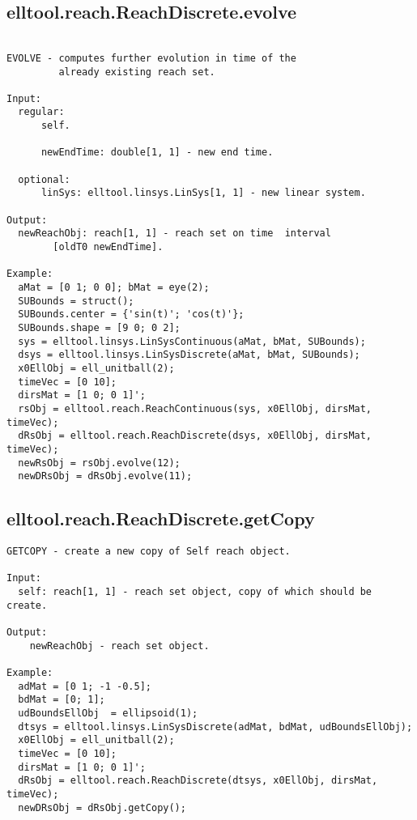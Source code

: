 \subsection{\texorpdfstring{elltool.reach.ReachDiscrete.evolve}{evolve}}\label{method:elltool.reach.ReachDiscrete.evolve}
\begin{verbatim}

EVOLVE - computes further evolution in time of the
         already existing reach set.

Input:
  regular:
      self.

      newEndTime: double[1, 1] - new end time.

  optional:
      linSys: elltool.linsys.LinSys[1, 1] - new linear system.

Output:
  newReachObj: reach[1, 1] - reach set on time  interval
        [oldT0 newEndTime].

Example:
  aMat = [0 1; 0 0]; bMat = eye(2);
  SUBounds = struct();
  SUBounds.center = {'sin(t)'; 'cos(t)'};
  SUBounds.shape = [9 0; 0 2];
  sys = elltool.linsys.LinSysContinuous(aMat, bMat, SUBounds);
  dsys = elltool.linsys.LinSysDiscrete(aMat, bMat, SUBounds);
  x0EllObj = ell_unitball(2);
  timeVec = [0 10];
  dirsMat = [1 0; 0 1]';
  rsObj = elltool.reach.ReachContinuous(sys, x0EllObj, dirsMat, timeVec);
  dRsObj = elltool.reach.ReachDiscrete(dsys, x0EllObj, dirsMat, timeVec);
  newRsObj = rsObj.evolve(12);
  newDRsObj = dRsObj.evolve(11);
\end{verbatim}
\subsection{\texorpdfstring{elltool.reach.ReachDiscrete.getCopy}{getCopy}}\label{method:elltool.reach.ReachDiscrete.getCopy}
\begin{verbatim}
GETCOPY - create a new copy of Self reach object.

Input:
  self: reach[1, 1] - reach set object, copy of which should be create.

Output:
    newReachObj - reach set object.

Example:
  adMat = [0 1; -1 -0.5];
  bdMat = [0; 1];
  udBoundsEllObj  = ellipsoid(1);
  dtsys = elltool.linsys.LinSysDiscrete(adMat, bdMat, udBoundsEllObj);
  x0EllObj = ell_unitball(2);
  timeVec = [0 10];
  dirsMat = [1 0; 0 1]';
  dRsObj = elltool.reach.ReachDiscrete(dtsys, x0EllObj, dirsMat, timeVec);
  newDRsObj = dRsObj.getCopy();
\end{verbatim}
